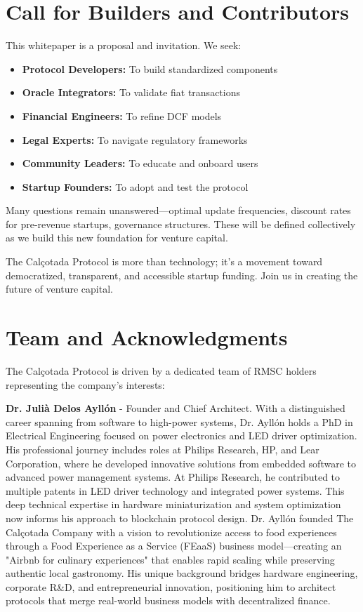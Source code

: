\documentclass[conference]{IEEEtran}
\begin{document}
\section{Call for Builders and Contributors}

This whitepaper is a proposal and invitation. We seek:
\begin{itemize}
    \item \textbf{Protocol Developers:} To build standardized components
    \item \textbf{Oracle Integrators:} To validate fiat transactions
    \item \textbf{Financial Engineers:} To refine DCF models
    \item \textbf{Legal Experts:} To navigate regulatory frameworks
    \item \textbf{Community Leaders:} To educate and onboard users
    \item \textbf{Startup Founders:} To adopt and test the protocol
\end{itemize}

Many questions remain unanswered—optimal update frequencies, discount rates for pre-revenue startups, governance structures. These will be defined collectively as we build this new foundation for venture capital.

The Calçotada Protocol is more than technology; it's a movement toward democratized, transparent, and accessible startup funding. Join us in creating the future of venture capital.



\section{Team and Acknowledgments}

The Calçotada Protocol is driven by a dedicated team of RMSC holders representing the company's interests:

\textbf{Dr. Julià Delos Ayllón} - Founder and Chief Architect. With a distinguished career spanning from software to high-power systems, Dr. Ayllón holds a PhD in Electrical Engineering focused on power electronics and LED driver optimization. His professional journey includes roles at Philips Research, HP, and Lear Corporation, where he developed innovative solutions from embedded software to advanced power management systems. At Philips Research, he contributed to multiple patents in LED driver technology and integrated power systems. This deep technical expertise in hardware miniaturization and system optimization now informs his approach to blockchain protocol design. Dr. Ayllón founded The Calçotada Company with a vision to revolutionize access to food experiences through a Food Experience as a Service (FEaaS) business model—creating an "Airbnb for culinary experiences" that enables rapid scaling while preserving authentic local gastronomy. His unique background bridges hardware engineering, corporate R\&D, and entrepreneurial innovation, positioning him to architect protocols that merge real-world business models with decentralized finance.
\end{document}
